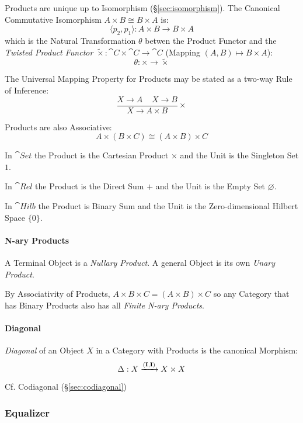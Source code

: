 Products are unique up to Isomorphism (\S\ref{sec:isomorphism}). The
Canonical Commutative Isomorphism $A \times B \cong B \times A$ is:
\[
  \langle p_2, p_1 \rangle : A \times B \rightarrow B \times A
\]
which is the Natural Transformation $\theta$ betwen the Product
Functor and the \emph{Twisted Product Functor} $\tilde{\times} :
\cat{C} \times \cat{C} \rightarrow \cat{C}$ (Mapping $(A,B)
\mapsto B \times A$):
\[
  \theta : \times \rightarrow \tilde{\times}
\]

The Universal Mapping Property for Products may be stated as a two-way
Rule of Inference:
\[
  {
    \frac{X \rightarrow A \;\;\;\; X \rightarrow B}
    {X \rightarrow A \times B}
  }\times
\]

Products are also Associative:
\[
  A \times (B \times C) \cong (A \times B) \times C
\]

In $\cat{Set}$ the Product is the Cartesian Product $\times$ and the
Unit is the Singleton Set $1$.

In $\cat{Rel}$ the Product is the Direct Sum $+$ and the Unit is
the Empty Set $\varnothing$.

In $\cat{Hilb}$ the Product is Binary Sum and the Unit is the
Zero-dimensional Hilbert Space $\{ 0 \}$. %



\paragraph{N-ary Products}\label{sec:category_nary}\hfill
A Terminal Object is a \emph{Nullary Product}. A general Object is its
own \emph{Unary Product}.

By Associativity of Products, $A \times B \times C = (A \times B)
\times C$ so any Category that has Binary Products also has all
\emph{Finite N-ary Products}.



\paragraph{Diagonal}\label{sec:diagonal}\hfill

\emph{Diagonal} of an Object $X$ in a Category with Products is the
canonical Morphism:
\[
  \Delta : X \xrightarrow{(\mathbf{I},\mathbf{I})} X \times X
\]

\fist Cf. Codiagonal (\S\ref{sec:codiagonal})



\subsubsection{Equalizer}\label{sec:equalizer}

